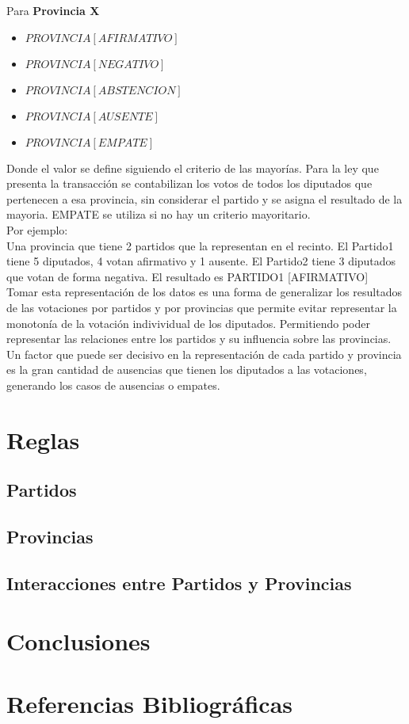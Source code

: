 \documentclass{endm}
\begin{document}
Para \textbf{Provincia X} \\

\begin{itemize}
\item $PROVINCIA [AFIRMATIVO]$
\item $PROVINCIA [NEGATIVO]$
\item $PROVINCIA [ABSTENCION]$
\item $PROVINCIA [AUSENTE]$ 
\item $PROVINCIA [EMPATE]$ \\
\end{itemize}

Donde el valor se define siguiendo el criterio de las mayorías. Para la ley que presenta la transacción se contabilizan los votos de todos los diputados que pertenecen a esa provincia, sin considerar el partido y se asigna el resultado de la mayoria. EMPATE se utiliza si no hay un criterio mayoritario. \\

Por ejemplo: \\

Una provincia que tiene 2 partidos que la representan en el recinto. El Partido1 tiene 5 diputados, 4 votan afirmativo y 1 ausente. El Partido2 tiene 3 diputados que votan de forma negativa. El resultado es PARTIDO1 [AFIRMATIVO] \\

Tomar esta representación de los datos es una forma de generalizar los resultados de las votaciones por partidos y por provincias que permite evitar representar la monotonía de la votación indivividual de los diputados. Permitiendo poder representar las relaciones entre los partidos y su influencia sobre las provincias.\\

Un factor que puede ser decisivo en la representación de cada partido y provincia es la gran cantidad de ausencias que tienen los diputados a las votaciones, generando los casos de ausencias o empates.

\section{Reglas}\label{desarrollo}

\subsection{Partidos}
\subsection{Provincias}
\subsection{Interacciones entre Partidos y Provincias}

\section{Conclusiones}

\section{Referencias Bibliográficas}
\end{document}
